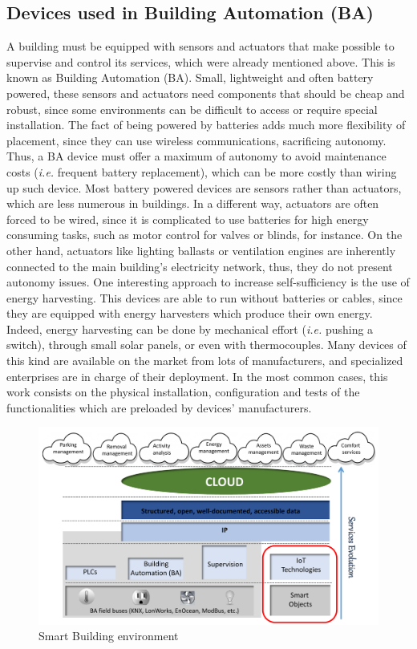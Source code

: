 \subsection{Devices used in Building Automation (BA)}
\label{subsec:Devices4BA}
A building must be equipped with sensors and actuators that make possible to supervise and control its services, which were already mentioned above.
This is known as Building Automation (BA).
Small, lightweight and often battery powered, these sensors and actuators need components that should be cheap and robust, since some environments can be difficult to access or require special installation\cite{younis2008placement}.
The fact of being powered by batteries adds much more flexibility of placement, since they can use wireless communications, sacrificing autonomy.
Thus, a BA device must offer a maximum of autonomy to avoid maintenance costs (\textit{i.e.} frequent battery replacement), which can be more costly than wiring up such device.
Most battery powered devices are sensors rather than actuators, which are less numerous in buildings.
In a different way, actuators are often forced to be wired, since it is complicated to use batteries for high energy consuming tasks, such as motor control for valves or blinds, for instance.
On the other hand, actuators like lighting ballasts or ventilation engines are inherently connected to the main building's electricity network, thus, they do not present autonomy issues.
One interesting approach to increase self-sufficiency is the use of energy harvesting\cite{grassl2006energy}.
This devices are able to run without batteries or cables, since they are equipped with energy harvesters which produce their own energy.
Indeed, energy harvesting can be done by mechanical effort (\textit{i.e.} pushing a switch), through small solar panels, or even with thermocouples.
Many devices of this kind are available on the market from lots of manufacturers, and specialized enterprises are in charge of their deployment.
In the most common cases, this work consists on the physical installation, configuration and tests of the functionalities which are preloaded by devices' manufacturers.

\begin{figure}[htb]
	\centering
	\includegraphics[width=1\columnwidth]{chapters/background.images/SmartServices.pdf}
	\caption{Smart Building environment}
	\label{fig:SmartServices}
\end{figure}

